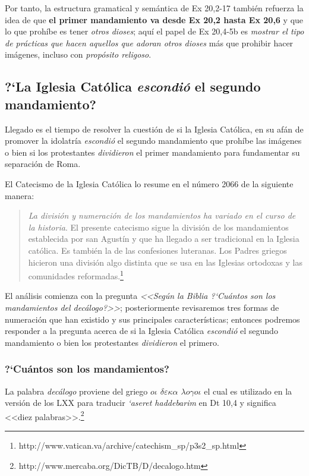 \documentclass{article}
\begin{document}
Por tanto, la estructura gramatical y sem\'antica de Ex 20,2-17 tambi\'en refuerza la idea de que \textbf{el primer mandamiento va desde Ex 20,2 hasta Ex 20,6} y que lo que proh\'{i}be es tener \emph{otros dioses}; aqu\'{i} el papel de Ex 20,4-5b es \emph{mostrar el tipo de pr\'acticas que hacen aquellos que adoran otros dioses} m\'as que prohibir hacer im\'agenes, incluso con \emph{prop\'osito religoso}.

\subsection{?`La Iglesia Cat\'olica \emph{escondi\'o} el segundo mandamiento?}

Llegado es el tiempo de resolver la cuesti\'on de si la Iglesia Cat\'olica, en su af\'an de promover la idolatr\'{i}a \emph{escondi\'o} el segundo mandamiento que proh\'{i}be las im\'agenes o bien si los protestantes \emph{dividieron} el primer mandamiento para fundamentar su separaci\'on de Roma.

El Catecismo de la Iglesia Cat\'olica lo resume en el n\'umero 2066 de la siguiente manera:

\begin{quote}
\emph{La división y numeración de los mandamientos ha variado en el curso de la historia}. El presente catecismo sigue la división de los mandamientos establecida por san Agustín y que ha llegado a ser tradicional en la Iglesia católica. Es también la de las confesiones luteranas. Los Padres griegos hicieron una división algo distinta que se usa en las Iglesias ortodoxas y las comunidades reformadas.\footnote{http://www.vatican.va/archive/catechism\_sp/p3s2\_sp.html}
\end{quote}

\noindent
El an\'alisis comienza con la pregunta \emph{<<Seg\'un la Biblia ?`Cu\'antos son los mandamientos del dec\'alogo?>>}; posteriormente revisaremos tres formas de numeraci\'on que han existido y sus principales caracter\'{i}sticas; entonces podremos responder a la pregunta acerca de si la Iglesia Cat\'olica \emph{escondi\'o} el segundo mandamiento o bien los protestantes \emph{dividieron} el primero.

\subsubsection{?`Cu\'antos son los mandamientos?}

La palabra \emph{dec\'alogo} proviene del griego \emph{$o \iota$ $ \delta\varepsilon\kappa\alpha$ $\lambda o \gamma o \iota$} el cual es utilizado en la versi\'on de los LXX para traducir \emph{{\lq}aseret haddebarim} en Dt 10,4 y significa <<diez palabras>>.\footnote{http://www.mercaba.org/DicTB/D/decalogo.htm}
\end{document}
